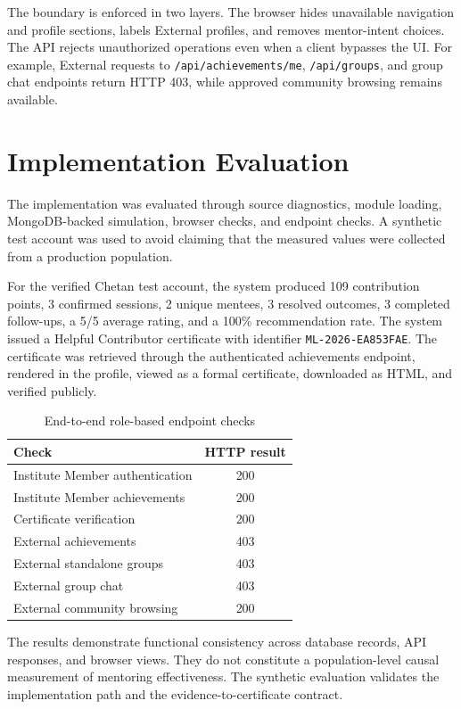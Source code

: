 \documentclass[conference]{IEEEtran}
\begin{document}
The boundary is enforced in two layers. The browser hides unavailable navigation and profile sections, labels External profiles, and removes mentor-intent choices. The API rejects unauthorized operations even when a client bypasses the UI. For example, External requests to \texttt{/api/achievements/me}, \texttt{/api/groups}, and group chat endpoints return HTTP 403, while approved community browsing remains available.

\section{Implementation Evaluation}
The implementation was evaluated through source diagnostics, module loading, MongoDB-backed simulation, browser checks, and endpoint checks. A synthetic test account was used to avoid claiming that the measured values were collected from a production population.

For the verified Chetan test account, the system produced 109 contribution points, 3 confirmed sessions, 2 unique mentees, 3 resolved outcomes, 3 completed follow-ups, a 5/5 average rating, and a 100\% recommendation rate. The system issued a Helpful Contributor certificate with identifier \texttt{ML-2026-EA853FAE}. The certificate was retrieved through the authenticated achievements endpoint, rendered in the profile, viewed as a formal certificate, downloaded as HTML, and verified publicly.

\begin{table}[t]
\caption{End-to-end role-based endpoint checks}
\label{tab:checks}
\centering
\begin{tabular}{p{}c}
\toprule
Check & HTTP result \\
\midrule
Institute Member authentication & 200 \\
Institute Member achievements & 200 \\
Certificate verification & 200 \\
External achievements & 403 \\
External standalone groups & 403 \\
External group chat & 403 \\
External community browsing & 200 \\
\bottomrule
\end{tabular}
\end{table}

The results demonstrate functional consistency across database records, API responses, and browser views. They do not constitute a population-level causal measurement of mentoring effectiveness. The synthetic evaluation validates the implementation path and the evidence-to-certificate contract.
\end{document}
